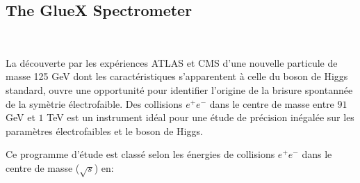 \subsection{The GlueX Spectrometer}

~\par La d\'ecouverte par les exp\'eriences ATLAS et CMS d'une nouvelle particule de masse 125 GeV dont les caract\'eristiques s'apparentent \`a celle du boson de Higgs standard, ouvre une opportunit\'e pour identifier l'origine de la brisure spontann\'ee de la sym\`etrie \'electrofaible. Des collisions $e^{+}e^{-}$  dans le centre de masse entre $91$ GeV et $1$ TeV est un instrument id\'eal pour une \'etude de pr\'ecision in\'egalée sur les param\`etres \'electrofaibles et le boson de Higgs.
~\par Ce programme d'\'etude est class\'e selon les \'energies de collisions $e^{+}e^{-}$ dans le centre de masse ($\sqrt{s}$) en:

